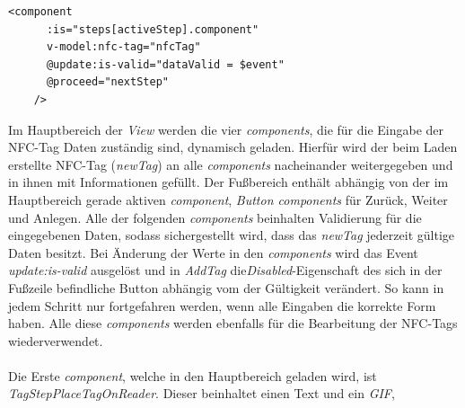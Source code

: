 \documentclass[10pt, a4paper]{article}
\begin{document}
\begin{onehalfspace}
\begin{minipage}{\textwidth}
  \begin{lstlisting}[caption={Dynamisches Laden der components von AddTag}, captionpos=b]
    <component
      :is="steps[activeStep].component"
      v-model:nfc-tag="nfcTag"
      @update:is-valid="dataValid = $event"
      @proceed="nextStep"
    />
  \end{lstlisting}
\end{minipage}

Im Hauptbereich der \textit{View} werden die vier \textit{components}, die für die Eingabe der NFC-Tag Daten zuständig sind, dynamisch geladen.
Hierfür wird der beim Laden erstellte NFC-Tag (\textit{newTag}) an alle \textit{components} nacheinander weitergegeben und in ihnen mit Informationen gefüllt.
Der Fußbereich enthält abhängig von der im Hauptbereich gerade aktiven \textit{component}, \textit{Button components} für \glqq Zurück\grqq{}, \glqq Weiter\grqq{} und
\glqq Anlegen\grqq.
Alle der folgenden \textit{components} beinhalten Validierung für die eingegebenen Daten, sodass sichergestellt wird, dass das \textit{newTag} jederzeit gültige Daten besitzt.
Bei Änderung der Werte in den \textit{components} wird das Event \textit{update:is-valid} ausgelöst und in \textit{AddTag} die\textit{Disabled}-Eigenschaft des sich in der Fußzeile befindliche Button abhängig vom der Gültigkeit verändert.
So kann in jedem Schritt nur fortgefahren werden, wenn alle Eingaben die korrekte Form haben.
Alle diese \textit{components} werden ebenfalls für die Bearbeitung der NFC-Tags wiederverwendet.
\\~\\
Die Erste \textit{component}, welche in den Hauptbereich geladen wird, ist \textit{TagStepPlaceTagOnReader}. Dieser beinhaltet einen Text und ein \textit{GIF},

\end{onehalfspace}
\end{document}
